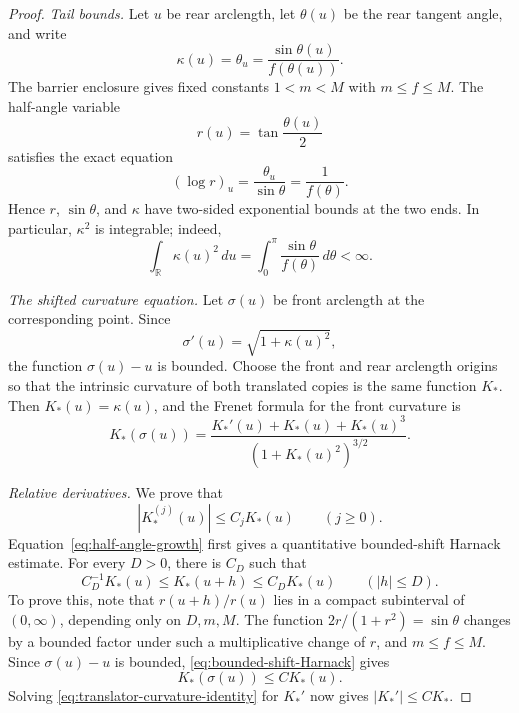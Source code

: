 \documentclass[11pt]{article}
\theoremstyle{remark}
\newcommand{\R}{\mathbb R}
\begin{document}
\begin{proof}
\emph{Tail bounds.}
Let \(u\) be rear arclength, let \(\theta(u)\) be the rear tangent angle,
and write
\[
   \kappa(u)=\theta_u=\frac{\sin\theta(u)}{f(\theta(u))}.
\]
The barrier enclosure gives fixed constants \(1<m<M\) with
\(m\leq f\leq M\).  The half-angle variable
\[
   r(u)=\tan\frac{\theta(u)}2
\]
satisfies the exact equation
\begin{equation}\label{eq:half-angle-growth}
   (\log r)_u
   =\frac{\theta_u}{\sin\theta}
   =\frac1{f(\theta)}.
\end{equation}
Hence \(r\), \(\sin\theta\), and \(\kappa\) have two-sided exponential
bounds at the two ends.  In particular, \(\kappa^2\) is integrable; indeed,
\[
   \int_\R\kappa(u)^2\,du
   =\int_0^\pi\frac{\sin\theta}{f(\theta)}\,d\theta<\infty.
\]

\emph{The shifted curvature equation.}
Let \(\sigma(u)\) be front arclength at the corresponding point.  Since
\[
   \sigma'(u)=\sqrt{1+\kappa(u)^2},
\]
the function \(\sigma(u)-u\) is bounded.  Choose the front and rear
arclength origins so that the intrinsic curvature of both translated copies
is the same function \(K_*\).  Then \(K_*(u)=\kappa(u)\), and the Frenet
formula for the front curvature is
\begin{equation}\label{eq:translator-curvature-identity}
   K_*(\sigma(u))
   =\frac{K_*'(u)+K_*(u)+K_*(u)^3}
          {(1+K_*(u)^2)^{3/2}}.
\end{equation}

\emph{Relative derivatives.}
We prove that
\begin{equation}\label{eq:relative-Kstar-derivatives}
   |K_*^{(j)}(u)|\leq C_jK_*(u)
   \qquad(j\geq0).
\end{equation}
Equation~\eqref{eq:half-angle-growth} first gives a quantitative
bounded-shift Harnack estimate.  For every \(D>0\), there is \(C_D\) such
that
\begin{equation}\label{eq:bounded-shift-Harnack}
 C_D^{-1}K_*(u)\leq K_*(u+h)\leq C_DK_*(u)
 \qquad(|h|\leq D).
\end{equation}
To prove this, note that \(r(u+h)/r(u)\) lies in a compact subinterval of
\((0,\infty)\), depending only on \(D,m,M\).  The function
\(2r/(1+r^2)=\sin\theta\) changes by a bounded factor under such a
multiplicative change of \(r\), and \(m\leq f\leq M\).  Since
\(\sigma(u)-u\) is bounded, \eqref{eq:bounded-shift-Harnack} gives
\[
   K_*(\sigma(u))\leq CK_*(u).
\]
Solving \eqref{eq:translator-curvature-identity} for \(K_*'\) now gives
\(|K_*'|\leq CK_*\).


\end{proof}
\end{document}
